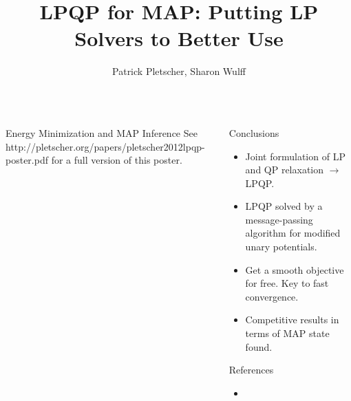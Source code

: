 \documentclass[final,t]{beamer}
\title{\LARGE LPQP for MAP: Putting LP Solvers to Better Use}
\author{Patrick Pletscher, Sharon Wulff}
\institute{\ }
\begin{document}
\begin{frame}{}
\begin{columns}[t]


\begin{column}{.47\linewidth}

    \begin{exampleblock}{Energy Minimization and MAP Inference}
        See http://pletscher.org/papers/pletscher2012lpqp-poster.pdf for a
        full version of this poster.
    \end{exampleblock}

\end{column}


\begin{column}{.47\linewidth}
  
    \begin{alertblock}{Conclusions}
        \begin{itemize}
            \item Joint formulation of LP and QP relaxation $\rightarrow$ LPQP.
            \item LPQP solved by a message-passing
            algorithm for modified unary potentials.
            \item Get a smooth objective for free. Key to fast convergence.
            \item Competitive results in terms of MAP state found.
        \end{itemize}
    \end{alertblock}

    \begin{block}{References}
        \vskip -0.8cm
        \footnotesize
        \begin{itemize}
            \item {}
        \end{itemize}
        \normalsize
        \vskip -0.8cm
    \end{block}


\end{column}

\end{columns}

\end{frame}
\end{document}
